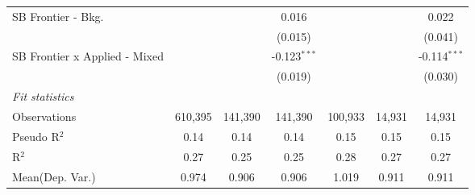 \begin{tabular}{lcccccc}
   SB Frontier - Bkg.            &               &               & 0.016          &               &               & 0.022\\   
                                 &               &               & (0.015)        &               &               & (0.041)\\   
   SB Frontier x Applied - Mixed &               &               & -0.123$^{***}$ &               &               & -0.114$^{***}$\\   
                                 &               &               & (0.019)        &               &               & (0.030)\\   
   \midrule
   \emph{Fit statistics}\\
   Observations                  & 610,395       & 141,390       & 141,390        & 100,933       & 14,931        & 14,931\\  
   Pseudo R$^2$                  & 0.14          & 0.14          & 0.14           & 0.15          & 0.15          & 0.15\\  
   R$^2$                         & 0.27          & 0.25          & 0.25           & 0.28          & 0.27          & 0.27\\  
Mean(Dep. Var.) & 0.974 & 0.906 & 0.906 & 1.019 & 0.911 & 0.911 \\
   

\end{tabular}
